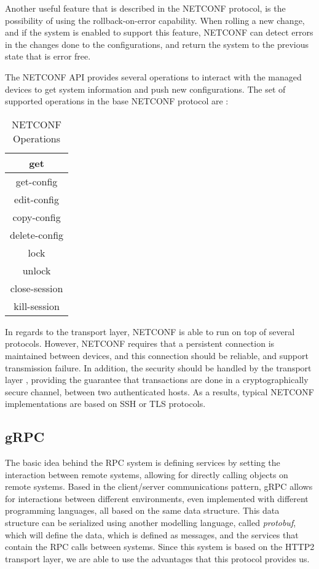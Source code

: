 \par Another useful feature that is described in the NETCONF protocol, is the possibility of using the rollback-on-error capability. When rolling a new change,
and if the system is enabled to support this feature, NETCONF can detect errors in the changes done to the configurations, and return the system to the previous
state that is error free. 

\par The NETCONF API provides several operations to interact with the managed devices to get system information and push new configurations. The set of supported 
operations in the base NETCONF protocol are \cite{enns_network_2011}:

\begin{table}
    \centering
    \caption{NETCONF Operations}
    \begin{tabular}{c}
       get  \\ \hline
       get-config  \\ \hline
       edit-config  \\ \hline
       copy-config  \\ \hline
       delete-config  \\ \hline
       lock  \\ \hline
       unlock  \\ \hline
       close-session  \\ \hline
       kill-session  
    \end{tabular}
\end{table}

\par In regards to the transport layer, NETCONF is able to run on top of several protocols. However, NETCONF requires that a persistent connection is maintained 
between devices, and this connection should be reliable, and support transmission failure. In addition, the security should be handled by the transport layer 
\cite{jurgen_schonwalder_network_2012}, providing the guarantee that transactions are done in a 
cryptographically secure channel, between two authenticated hosts. As a results, typical NETCONF implementations are based on SSH or TLS protocols.

\subsection {gRPC}  \label {ssec:grpc}

The basic idea behind the RPC system is defining services by setting the interaction between remote systems, allowing for directly calling objects on remote
systems. Based in the client/server communications pattern, gRPC allows for interactions between different environments, even implemented with different programming
languages, all based on the same data structure. This data structure can be serialized using another modelling language, called \textit {protobuf}, which will
define the data, which is defined as messages, and the services that contain the RPC calls between systems. Since this system is based on the HTTP2 transport layer,
we are able to use the advantages that this protocol provides us.

